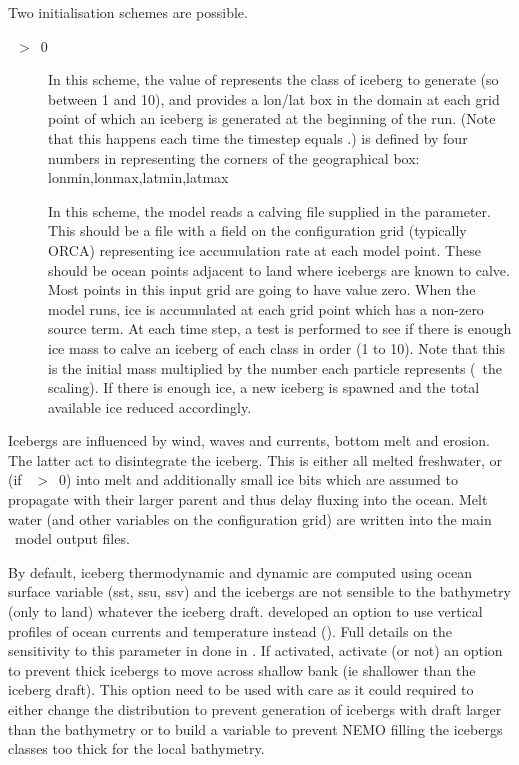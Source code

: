 \documentclass[../main/NEMO_manual]{subfiles}
\begin{document}
Two initialisation schemes are possible.
\begin{description}
\item [{~$>$~0}] In this scheme, the value of  represents the class of iceberg to generate
  (so between 1 and 10), and  provides a lon/lat box in the domain at each grid point of
  which an iceberg is generated at the beginning of the run.
  (Note that this happens each time the timestep equals .)
   is defined by four numbers in  representing the corners of
  the geographical box: lonmin,lonmax,latmin,latmax
\item [{}] In this scheme, the model reads a calving file supplied in the  parameter.
  This should be a file with a field on the configuration grid (typically ORCA)
  representing ice accumulation rate at each model point.
  These should be ocean points adjacent to land where icebergs are known to calve.
  Most points in this input grid are going to have value zero.
  When the model runs, ice is accumulated at each grid point which has a non-zero source term.
  At each time step, a test is performed to see if there is enough ice mass to
  calve an iceberg of each class in order (1 to 10).
  Note that this is the initial mass multiplied by the number each particle represents (\ie\ the scaling).
  If there is enough ice, a new iceberg is spawned and the total available ice reduced accordingly.
\end{description}

Icebergs are influenced by wind, waves and currents, bottom melt and erosion.
The latter act to disintegrate the iceberg.
This is either all melted freshwater,
or (if ~$>$~0) into melt and additionally small ice bits
which are assumed to propagate with their larger parent and thus delay fluxing into the ocean.
Melt water (and other variables on the configuration grid) are written into the main \NEMO\ model output files.

By default, iceberg thermodynamic and dynamic are computed using ocean surface variable (sst, ssu, ssv) and the icebergs are not sensible to the bathymetry (only to land) whatever the iceberg draft. 
\citet{Merino_OM2016} developed an option to use vertical profiles of ocean currents and temperature instead ().
Full details on the sensitivity to this parameter in done in \citet{Merino_OM2016}. 
If  activated,  activate (or not) an option to prevent thick icebergs to move across shallow bank (ie shallower than the iceberg draft).
This option need to be used with care as it could required to either change the distribution to prevent generation of icebergs with draft larger than the bathymetry 
or to build a variable  to prevent NEMO filling the icebergs classes too thick for the local bathymetry.
\end{document}
